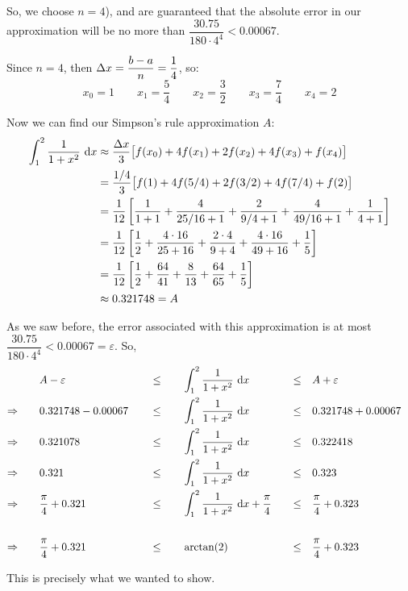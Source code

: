 \begin{solution}
 So, we choose $n=4$), and are guaranteed that the absolute error in our approximation will be no more than $\dfrac{30.75}{180\cdot 4^4} < 0.00067$.

Since $n=4$, then $\Delta x = \dfrac{b-a}{n}=\dfrac{1}{4}$, so:
\[x_0 = 1 \qquad x_1=\frac{5}{4} \qquad x_2 = \frac{3}{2} \qquad x_3 = \frac{7}{4} \qquad x_4=2\]

Now we can find our Simpson's rule approximation $A$:
\begin{align*}
\int_1^2 \frac{1}{1+x^2}~\mathrm{d}x&\approx \frac{\Delta x}{3}\big[
f(x_0) + 4f(x_1)+2f(x_2)+4f(x_3)+f(x_4)
\big]\\
&=\frac{1/4}{3}\big[
f(1) + 4f(5/4)+2f(3/2)+4f(7/4)+f(2)
\big]\\
&=\frac{1}{12}\left[
\frac{1}{1+1} + \frac{4}{25/16+1}+\frac{2}{9/4+1}+\frac{4}{49/16+1}+\frac{1}{4+1}
\right]\\
&=\frac{1}{12}\left[
\frac{1}{2} + \frac{4\cdot 16}{25+16}+\frac{2\cdot 4}{9+4}+\frac{4\cdot 16}{49+16}+\frac{1}{5}
\right]\\
&=\frac{1}{12}\left[
\frac{1}{2} + \frac{64}{41}+\frac{8}{13}+\frac{64}{65}+\frac{1}{5}
\right]\\
&\approx 0.321748=A
\end{align*}

As we saw before, the error associated with this approximation is at most $ \dfrac{30.75}{180\cdot 4^4} < 0.00067=\varepsilon$. So,
\begin{alignat*}{5}
&A-\varepsilon \quad&&\leq\quad && \int_1^2\frac{1}{1+x^2}~\mathrm{d}x   &\leq \quad &A+\varepsilon&\\
\Rightarrow\qquad&0.321748 - 0.00067 \quad&&\leq\quad && \int_1^2\frac{1}{1+x^2}~\mathrm{d}x  \quad &\leq \quad &0.321748 + 0.00067&\\
\Rightarrow\qquad&0.321078 &&\leq\quad & &\int_1^2\frac{1}{1+x^2}~\mathrm{d}x\quad   &\leq \quad &0.322418&\\
\Rightarrow\qquad&0.321 &&\leq\quad  &&\int_1^2\frac{1}{1+x^2}~\mathrm{d}x\quad   &\leq \quad &0.323&
\\\Rightarrow\qquad&\frac{\pi}{4}+0.321 && \leq\quad  &&\int_1^2\frac{1}{1+x^2}~\mathrm{d}x+\frac{\pi}{4}\quad   &\leq \quad &\frac{\pi}{4}+0.323&
\\\\\Rightarrow\qquad&\frac{\pi}{4}+0.321 && \leq\quad &&\arctan(2)   &\leq \quad &\frac{\pi}{4}+0.323&
\end{alignat*}

This is precisely what we wanted to show.
\end{solution}
